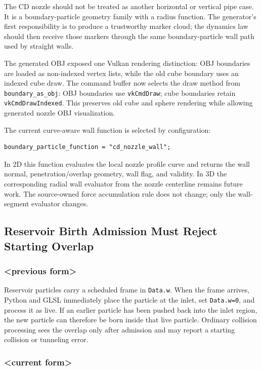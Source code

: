 The CD nozzle should not be treated as another horizontal or vertical pipe
case.  It is a boundary-particle geometry family with a radius function.  The
generator's first responsibility is to produce a trustworthy marker cloud; the
dynamics law should then receive those markers through the same
boundary-particle wall path used by straight walls.

The generated OBJ exposed one Vulkan rendering distinction: OBJ boundaries
are loaded as non-indexed vertex lists, while the old cube boundary uses an
indexed cube draw.  The command buffer now selects the draw method from
\texttt{boundary\_as\_obj}: OBJ boundaries use \texttt{vkCmdDraw}; cube
boundaries retain \texttt{vkCmdDrawIndexed}.  This preserves old cube and
sphere rendering while allowing generated nozzle OBJ visualization.

The current curve-aware wall function is selected by configuration:
\begin{verbatim}
boundary_particle_function = "cd_nozzle_wall";
\end{verbatim}
In 2D this function evaluates the local nozzle profile curve and returns the
wall normal, penetration/overlap geometry, wall flag, and validity.  In 3D the
corresponding radial wall evaluator from the nozzle centerline remains future
work.  The source-owned force accumulation rule does not change; only the
wall-segment evaluator changes.

\subsection{Reservoir Birth Admission Must Reject Starting Overlap}

\subsubsection{<previous form>}

Reservoir particles carry a scheduled frame in \texttt{Data.w}.  When the
frame arrives, Python and GLSL immediately place the particle at the inlet,
set \texttt{Data.w=0}, and process it as live.  If an earlier particle has
been pushed back into the inlet region, the new particle can therefore be born
inside that live particle.  Ordinary collision processing sees the overlap
only after admission and may report a starting collision or tunneling error.

\subsubsection{<current form>}

